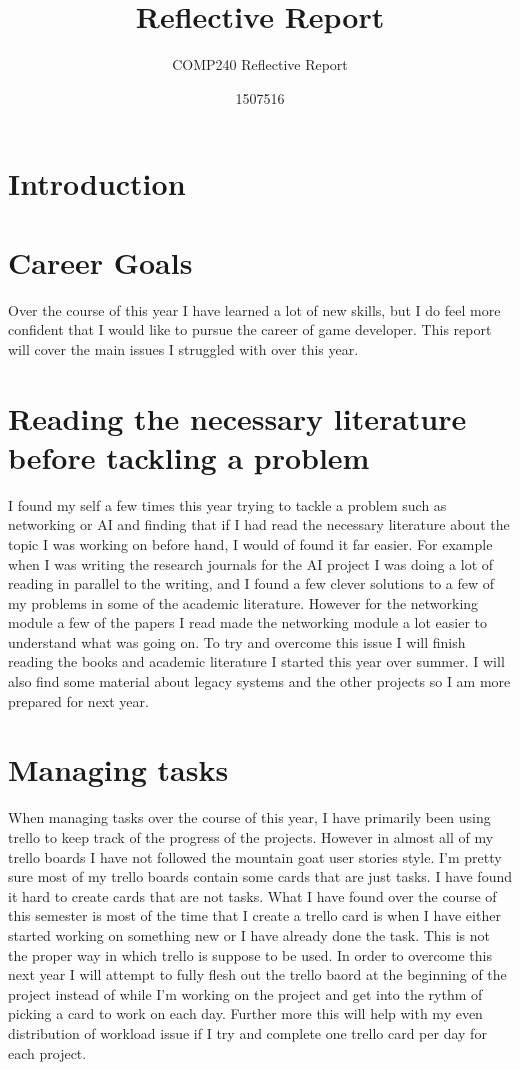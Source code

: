 \documentclass{scrartcl}
\title{Reflective Report}
\subtitle{COMP240 Reflective Report}
\author{1507516}
\begin{document}
\maketitle


\section{Introduction}


\section{Career Goals}
Over the course of this year I have learned a lot of new skills, but I do feel more confident that I would like to pursue the career of game developer.
This report will cover the main issues I struggled with over this year.



\section{Reading the necessary literature before tackling a problem}
I found my self a few times this year trying to tackle a problem such as networking or AI and finding that if I had read the necessary literature about the topic I was working on before hand, I would of found it far easier. For example when I was writing the research journals for the AI project I was doing a lot of reading in parallel to the writing, and I found a few clever solutions to a few of my problems in some of the academic literature. However for the networking module a few of the papers I read made the networking module a lot easier to understand what was going on.
To try and overcome this issue I will finish reading the books and academic literature I started this year over summer. I will also find some material about legacy systems and the other projects so I am more prepared for next year.

\section{Managing tasks}
When managing tasks over the course of this year, I have primarily been using trello to keep track of the progress of the projects. However in almost all of my trello boards I have not followed the mountain goat user stories style. I'm pretty sure most of my trello boards contain some cards that are just tasks. I have found it hard to create cards that are not tasks. What I have found over the course of this semester is most of the time that I create a trello card is when I have either started working on something new or I have already done the task. This is not the proper way in which trello is suppose to be used.
In order to overcome this next year I will attempt to fully flesh out the trello baord at the beginning of the project instead of while I'm working on the project and get into the rythm of picking a card to work on each day. Further more this will help with my even distribution of workload issue if I try and complete one trello card per day for each project.
\end{document}
